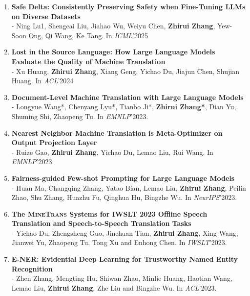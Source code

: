 \documentclass{resume}
\begin{document}
\begin{enumerate}

\item \normalsize \textbf{Safe Delta: Consistently Preserving Safety when Fine-Tuning LLMs on Diverse Datasets}\\
\small - Ning Lu1, Shengcai Liu, Jiahao Wu, Weiyu Chen, \textbf{Zhirui Zhang}, Yew-Soon Ong, Qi Wang, Ke Tang. In \textit{ICML}'2025

\item \normalsize \textbf{Lost in the Source Language: How Large Language Models Evaluate the Quality of Machine Translation}\\
\small - Xu Huang, \textbf{Zhirui Zhang}, Xiang Geng, Yichao Du, Jiajun Chen, Shujian Huang. In \textit{ACL}'2024

\item \normalsize \textbf{Document-Level Machine Translation with Large Language Models}\\ 
\small - Longyue Wang*, Chenyang Lyu*, Tianbo Ji*, \textbf{Zhirui Zhang*}, Dian Yu, Shuming Shi, Zhaopeng Tu. In \textit{EMNLP}'2023.

\item \normalsize \textbf{Nearest Neighbor Machine Translation is Meta-Optimizer on Output Projection Layer}\\ 
\small - Ruize Gao,  \textbf{Zhirui Zhang}, Yichao Du, Lemao Liu, Rui Wang. In \textit{EMNLP}'2023.

\item \normalsize \textbf{Fairness-guided Few-shot Prompting for Large Language Models}\\ 
\small - Huan Ma, Changqing Zhang, Yatao Bian, Lemao Liu, \textbf{Zhirui Zhang}, Peilin Zhao, Shu Zhang, Huazhu Fu, Qinghua Hu, Bingzhe Wu. In \textit{NeurIPS}'2023.

\item \normalsize \textbf{The \textsc{MineTrans} Systems for IWSLT 2023 Offline Speech Translation and Speech-to-Speech Translation Tasks}\\ 
\small - Yichao Du, Zhengsheng Guo, Jinchuan Tian, \textbf{Zhirui Zhang}, Xing Wang, Jianwei Yu, Zhaopeng Tu, Tong Xu and Enhong Chen. In \textit{IWSLT}'2023.

\item \normalsize \textbf{E-NER: Evidential Deep Learning for Trustworthy Named Entity Recognition}\\
\small - Zhen Zhang, Mengting Hu, Shiwan Zhao, Minlie Huang, Haotian Wang, Lemao Liu, \textbf{Zhirui Zhang}, Zhe Liu and Bingzhe Wu.  In \textit{ACL}'2023.


\end{enumerate}
\end{document}
